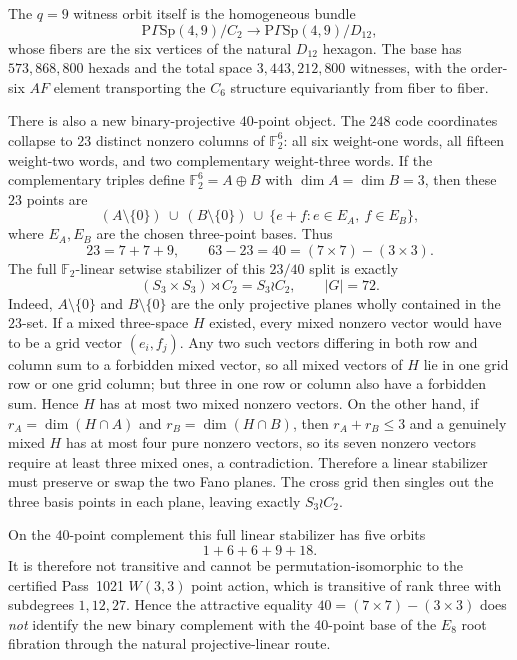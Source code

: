 The $q=9$ witness orbit itself is the homogeneous bundle
\[
 \mathrm{P}\Gamma\mathrm{Sp}(4,9)/C_2
 \longrightarrow
 \mathrm{P}\Gamma\mathrm{Sp}(4,9)/D_{12},
\]
whose fibers are the six vertices of the natural $D_{12}$ hexagon.  The base has $573{,}868{,}800$ hexads and the total space $3{,}443{,}212{,}800$ witnesses, with the order-six $AF$ element transporting the $C_6$ structure equivariantly from fiber to fiber.

There is also a new binary-projective $40$-point object.  The $248$ code coordinates collapse to $23$ distinct nonzero columns of $\mathbb F_2^6$: all six weight-one words, all fifteen weight-two words, and two complementary weight-three words.  If the complementary triples define $\mathbb F_2^6=A\oplus B$ with $\dim A=\dim B=3$, then these $23$ points are
\[
 (A\setminus\{0\})\ \cup\ (B\setminus\{0\})\ \cup\
 \{e+f:e\in E_A,\ f\in E_B\},
\]
where $E_A,E_B$ are the chosen three-point bases.  Thus
\[
 \boxed{23=7+7+9},\qquad
 \boxed{63-23=40=(7\times7)-(3\times3)}.
\]
The full $\mathbb F_2$-linear setwise stabilizer of this $23/40$ split is exactly
\[
 \boxed{(S_3\times S_3)\rtimes C_2=S_3\wr C_2},\qquad |G|=72.
\]
Indeed, $A\setminus\{0\}$ and $B\setminus\{0\}$ are the only projective planes wholly contained in the $23$-set.  If a mixed three-space $H$ existed, every mixed nonzero vector would have to be a grid vector $(e_i,f_j)$.  Any two such vectors differing in both row and column sum to a forbidden mixed vector, so all mixed vectors of $H$ lie in one grid row or one grid column; but three in one row or column also have a forbidden sum.  Hence $H$ has at most two mixed nonzero vectors.  On the other hand, if $r_A=\dim(H\cap A)$ and $r_B=\dim(H\cap B)$, then $r_A+r_B\le3$ and a genuinely mixed $H$ has at most four pure nonzero vectors, so its seven nonzero vectors require at least three mixed ones, a contradiction.  Therefore a linear stabilizer must preserve or swap the two Fano planes.  The cross grid then singles out the three basis points in each plane, leaving exactly $S_3\wr C_2$.

On the $40$-point complement this full linear stabilizer has five orbits
\[
 \boxed{1+6+6+9+18}.
\]
It is therefore not transitive and cannot be permutation-isomorphic to the certified Pass~1021 $W(3,3)$ point action, which is transitive of rank three with subdegrees $1,12,27$.  Hence the attractive equality $40=(7\times7)-(3\times3)$ does \emph{not} identify the new binary complement with the $40$-point base of the $E_8$ root fibration through the natural projective-linear route.

